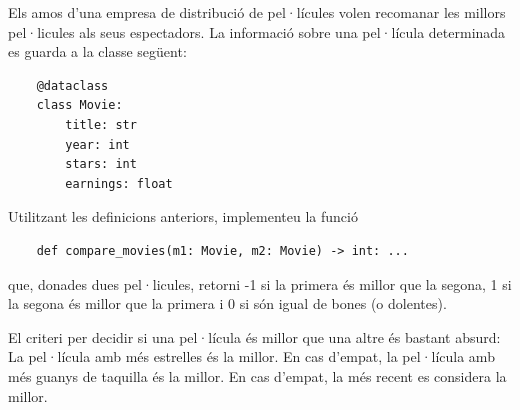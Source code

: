 
\Statement

Els amos d'una empresa de distribució de pel·lícules volen recomanar les millors pel·licules als seus espectadors. La informació sobre una pel·lícula determinada es guarda a la classe següent:

\lstset{language=Python}
\begin{lstlisting}
    @dataclass
    class Movie:
        title: str
        year: int
        stars: int
        earnings: float
\end{lstlisting}

Utilitzant les definicions anteriors, implementeu la funció

\begin{lstlisting}
    def compare_movies(m1: Movie, m2: Movie) -> int: ...
\end{lstlisting}

que, donades dues pel·licules, retorni -1 si la primera és millor que la segona, 1 si la segona és millor que la primera i 0 si són igual de bones (o dolentes). 

\medskip

El criteri per decidir si una pel·lícula és millor que una altre és bastant absurd:
La pel·lícula amb més estrelles és la millor. En cas d'empat, la pel·lícula amb més guanys de taquilla és la millor. En cas d'empat, la més recent es considera la millor.


\ObservationNoMainTuples
